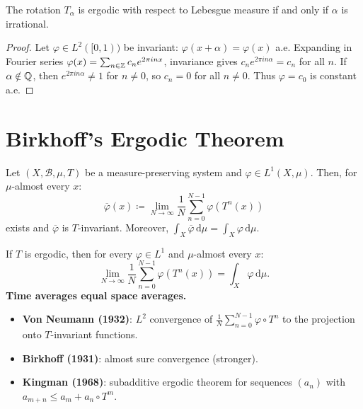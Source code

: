 \begin{theorem}
The rotation $T_\alpha$ is ergodic with respect to Lebesgue measure if and
only if $\alpha$ is irrational.
\end{theorem}

\begin{proof}
Let $\varphi \in L^2([0,1))$ be invariant: $\varphi(x + \alpha) = \varphi(x)$
a.e. Expanding in Fourier series
$\varphi(x) = \sum_{n \in \mathbb{Z}} c_n e^{2\pi inx}$, invariance gives
$c_n e^{2\pi in\alpha} = c_n$ for all $n$. If $\alpha \notin \mathbb{Q}$, then
$e^{2\pi in\alpha} \neq 1$ for $n \neq 0$, so $c_n = 0$ for all $n \neq 0$.
Thus $\varphi = c_0$ is constant a.e.
\end{proof}

\section{Birkhoff's Ergodic Theorem}

\begin{theorem}[Birkhoff, 1931]
\label{thm:birkhoff}
Let $(X, \mathcal{B}, \mu, T)$ be a measure-preserving system and
$\varphi \in L^1(X, \mu)$. Then, for $\mu$-almost every $x$:
\[
    \overline{\varphi}(x) \coloneqq \lim_{N \to \infty} \frac{1}{N}
    \sum_{n=0}^{N-1} \varphi(T^n(x))
\]
exists and $\overline{\varphi}$ is $T$-invariant. Moreover,
$\int_X \overline{\varphi}\,\mathrm{d}\mu = \int_X \varphi\,\mathrm{d}\mu$.
\end{theorem}

\begin{corollary}
If $T$ is ergodic, then for every $\varphi \in L^1$ and $\mu$-almost every $x$:
\[
    \lim_{N \to \infty} \frac{1}{N} \sum_{n=0}^{N-1} \varphi(T^n(x))
    = \int_X \varphi\,\mathrm{d}\mu.
\]
\textbf{Time averages equal space averages.}
\end{corollary}

\begin{keyformulas}[title=\textbf{Fundamental Ergodic Theorems}]
\begin{itemize}
    \item \textbf{Von Neumann (1932)}: $L^2$ convergence of
    $\frac{1}{N}\sum_{n=0}^{N-1}\varphi \circ T^n$ to the projection onto
    $T$-invariant functions.
    \item \textbf{Birkhoff (1931)}: almost sure convergence (stronger).
    \item \textbf{Kingman (1968)}: subadditive ergodic theorem for sequences
    $(a_n)$ with $a_{m+n} \leq a_m + a_n \circ T^m$.
\end{itemize}
\end{keyformulas}

